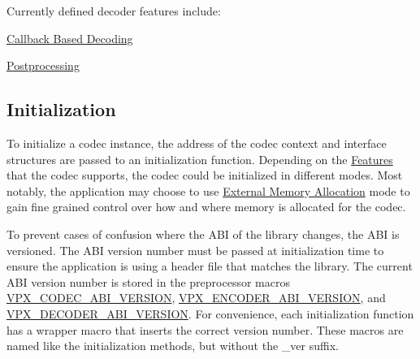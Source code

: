 Currently defined decoder features include\+:
\begin{DoxyItemize}
\item \hyperlink{usage_decode_usage_cb}{Callback Based Decoding}
\item \hyperlink{usage_decode_usage_postproc}{Postprocessing}
\end{DoxyItemize}\hypertarget{usage_usage_init}{}\subsection{Initialization}\label{usage_usage_init}
To initialize a codec instance, the address of the codec context and interface structures are passed to an initialization function. Depending on the \hyperlink{usage_usage_features}{Features} that the codec supports, the codec could be initialized in different modes. Most notably, the application may choose to use \hyperlink{usage_xma}{External Memory Allocation} mode to gain fine grained control over how and where memory is allocated for the codec.

To prevent cases of confusion where the A\+B\+I of the library changes, the A\+B\+I is versioned. The A\+B\+I version number must be passed at initialization time to ensure the application is using a header file that matches the library. The current A\+B\+I version number is stored in the preprocessor macros \hyperlink{group__codec_gaf7e9cad2df0f81679b881f46740ad097}{V\+P\+X\+\_\+\+C\+O\+D\+E\+C\+\_\+\+A\+B\+I\+\_\+\+V\+E\+R\+S\+I\+O\+N}, \hyperlink{group__encoder_gaa4f0b52293c08ba672429c3a03648b9d}{V\+P\+X\+\_\+\+E\+N\+C\+O\+D\+E\+R\+\_\+\+A\+B\+I\+\_\+\+V\+E\+R\+S\+I\+O\+N}, and \hyperlink{group__decoder_ga462b459e7ae13937e1eae1776245db12}{V\+P\+X\+\_\+\+D\+E\+C\+O\+D\+E\+R\+\_\+\+A\+B\+I\+\_\+\+V\+E\+R\+S\+I\+O\+N}. For convenience, each initialization function has a wrapper macro that inserts the correct version number. These macros are named like the initialization methods, but without the \+\_\+ver suffix.

